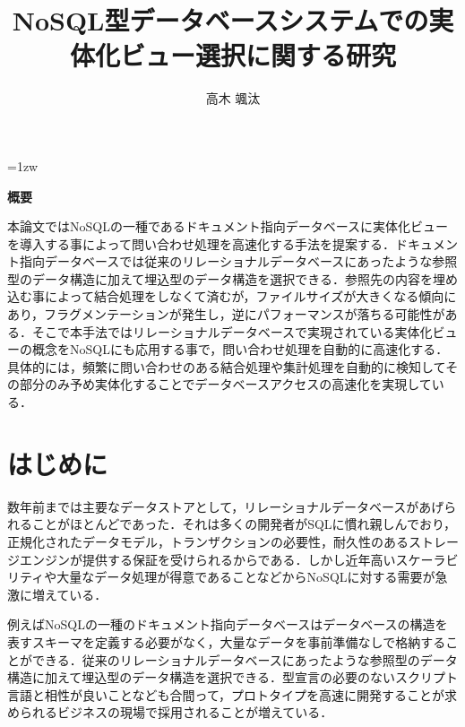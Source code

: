 \documentclass[a4paper,11pt]{ujreport}
\title{NoSQL型データベースシステムでの実体化ビュー選択に関する研究}
\author{高木 颯汰}
\begin{document}
\maketitle
\thispagestyle{empty}
\newpage

\thispagestyle{empty}
\vspace*{20pt plus 1fil}
\parindent=1zw
\noindent
\begin{center}
	{\bf 概要}
	\vspace{5mm}
\end{center}
本論文ではNoSQLの一種であるドキュメント指向データベースに実体化ビューを導入する事によって問い合わせ処理を高速化する手法を提案する．ドキュメント指向データベースでは従来のリレーショナルデータベースにあったような参照型のデータ構造に加えて埋込型のデータ構造を選択できる．参照先の内容を埋め込む事によって結合処理をしなくて済むが，ファイルサイズが大きくなる傾向にあり，フラグメンテーションが発生し，逆にパフォーマンスが落ちる可能性がある．そこで本手法ではリレーショナルデータベースで実現されている実体化ビューの概念をNoSQLにも応用する事で，問い合わせ処理を自動的に高速化する．具体的には，頻繁に問い合わせのある結合処理や集計処理を自動的に検知してその部分のみ予め実体化することでデータベースアクセスの高速化を実現している．

\par
\vspace{0pt plus 1fil}
\newpage

\tableofcontents
\listoffigures

\pagebreak \setcounter{page}{1}


\chapter{はじめに}

数年前までは主要なデータストアとして，リレーショナルデータベースがあげられることがほとんどであった．それは多くの開発者がSQLに慣れ親しんでおり，正規化されたデータモデル，トランザクションの必要性，耐久性のあるストレージエンジンが提供する保証を受けられるからである\cite{Sky株式会社201212}．しかし近年高いスケーラビリティや大量なデータ処理が得意であることなどからNoSQLに対する需要が急激に増えている．

例えばNoSQLの一種のドキュメント指向データベースはデータベースの構造を表すスキーマを定義する必要がなく，大量なデータを事前準備なしで格納することができる．従来のリレーショナルデータベースにあったような参照型のデータ構造に加えて埋込型のデータ構造を選択できる．型宣言の必要のないスクリプト言語と相性が良いことなども合間って，プロトタイプを高速に開発することが求められるビジネスの現場で採用されることが増えている\cite{渡部201602}．
\end{document}
